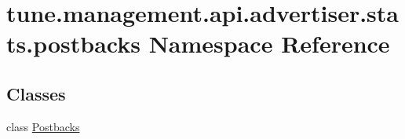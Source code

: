 \hypertarget{namespacetune_1_1management_1_1api_1_1advertiser_1_1stats_1_1postbacks}{\section{tune.\-management.\-api.\-advertiser.\-stats.\-postbacks Namespace Reference}
\label{namespacetune_1_1management_1_1api_1_1advertiser_1_1stats_1_1postbacks}
}
\subsection*{Classes}
\begin{DoxyCompactItemize}
\item 
class \hyperlink{classtune_1_1management_1_1api_1_1advertiser_1_1stats_1_1postbacks_1_1Postbacks}{Postbacks}
\end{DoxyCompactItemize}
